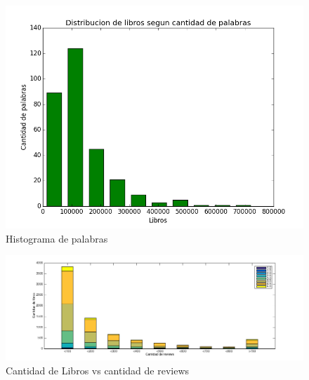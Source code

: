 \documentclass[12pt,journal,compsoc]{IEEEtran}
\begin{document}
\begin{figure}[H]
\begin{center}
  \includegraphics[width=6.0in]{../unigrams/scripts/histogram/histogramaDePalabras.png}
  \caption{Histograma de palabras}
  \end{center}
\end{figure}


\begin{figure}[H]
  \includegraphics[width=8.0in]{imgs/cantLibrosVScantReviews.png}
  \caption{Cantidad de Libros vs cantidad de reviews}
\end{figure}

\end{document}
